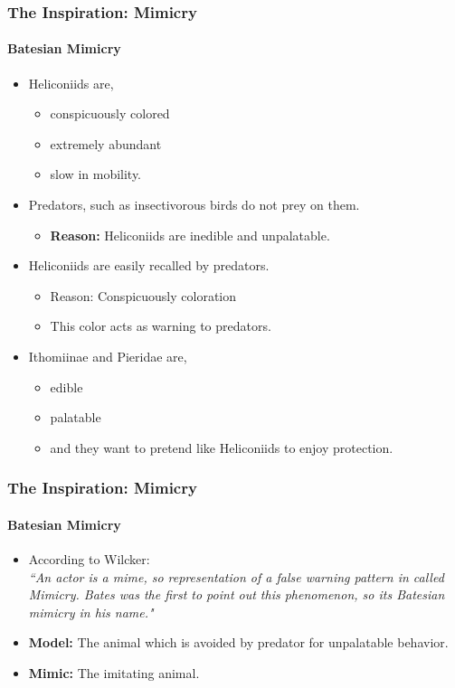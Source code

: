 \frame
{
	\frametitle{The Inspiration: Mimicry}
	\framesubtitle{Batesian Mimicry}
	
	\begin{itemize}
		\item Heliconiids are,
			\begin{itemize}
				\item conspicuously colored
				\item extremely abundant 
				\item slow in mobility.
			\end{itemize}
		\item Predators, such as insectivorous birds do not prey on them.
			\begin{itemize}
				\item \textbf{Reason:} Heliconiids are inedible and unpalatable.
			\end{itemize}
		\item Heliconiids are easily recalled by predators. 
			\begin{itemize}
				\item Reason: Conspicuously coloration
				\item This color acts as warning to predators.
			\end{itemize}
		\item Ithomiinae and Pieridae are,
			\begin{itemize}
				\item edible 
				\item palatable
				\item and they want to pretend like Heliconiids to enjoy protection.
			\end{itemize}
	\end{itemize}
}

\frame
{
	\frametitle{The Inspiration: Mimicry}
	\framesubtitle{Batesian Mimicry}
	
	\begin{itemize}
		\item According to Wilcker: \\
			\textsl{``An actor is a mime, so representation of a false warning pattern in called Mimicry. Bates was the first to point out this phenomenon, so its Batesian mimicry in his name."}
		\item \textbf{Model:} The animal which is avoided by predator for unpalatable behavior.
		\item \textbf{Mimic:} The imitating animal.
	\end{itemize}
}

